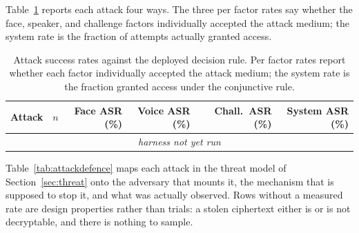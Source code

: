 \documentclass[runningheads]{llncs}
\providecommand{\AttackRows}{\multicolumn{6}{c}{\textit{harness not yet run}}\\}
\begin{document}
{Table~\ref{tab:attacks} reports each attack four ways. The three per factor rates say whether the face, speaker, and challenge factors individually accepted the attack medium; the system rate is the fraction of attempts actually granted access.

\begin{table}[!t]
\caption{Attack success rates against the deployed decision rule. Per factor rates report whether each factor individually accepted the attack medium; the system rate is the fraction granted access under the conjunctive rule.}
\label{tab:attacks}
\centering
\renewcommand{\arraystretch}{1.18}
\setlength{\tabcolsep}{5pt}
\footnotesize
\begin{tabular}{lrrrrr}
\toprule
\textbf{Attack} & \textbf{$n$} & \textbf{Face ASR (\%)} & \textbf{Voice ASR (\%)} & \textbf{Chall.\ ASR (\%)} & \textbf{System ASR (\%)} \\
\midrule
\AttackRows
\bottomrule
\end{tabular}
\end{table}

Table~\ref{tab:attackdefence} maps each attack in the threat model of
Section~\ref{sec:threat} onto the adversary that mounts it, the mechanism that is
supposed to stop it, and what was actually observed. Rows without a measured rate
are design properties rather than trials: a stolen ciphertext either is or is not
decryptable, and there is nothing to sample.

}
\end{document}
